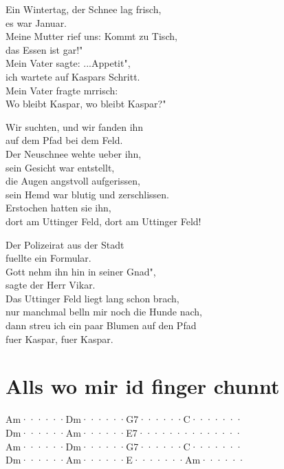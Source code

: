 \documentclass[
  letterpaper,
  twoside=false]{scrbook}
\begin{document}
Ein Wintertag, der Schnee lag frisch,\\
es war Januar.\\
Meine Mutter rief uns: Kommt zu Tisch,\\
das Essen ist gar!"\\
Mein Vater sagte: ...Appetit",\\
ich wartete auf Kaspars Schritt.\\
Mein Vater fragte mrrisch:\\
Wo bleibt Kaspar, wo bleibt Kaspar?"

Wir suchten, und wir fanden ihn\\
auf dem Pfad bei dem Feld.\\
Der Neuschnee wehte ueber ihn,\\
sein Gesicht war entstellt,\\
die Augen angstvoll aufgerissen,\\
sein Hemd war blutig und zerschlissen.\\
Erstochen hatten sie ihn,\\
dort am Uttinger Feld, dort am Uttinger Feld!

Der Polizeirat aus der Stadt\\
fuellte ein Formular.\\
Gott nehm\textquotesingle{} ihn hin in seiner Gnad"\textquotesingle,\\
sagte der Herr Vikar.\\
Das Uttinger Feld liegt lang schon brach,\\
nur manchmal bell\textquotesingle n mir noch die Hunde nach,\\
dann streu\textquotesingle{} ich ein paar Blumen auf den Pfad\\
fuer Kaspar, fuer Kaspar.

\hypertarget{alls-wo-mir-id-finger-chunnt}{%
\chapter{Alls wo mir id finger
chunnt}\label{alls-wo-mir-id-finger-chunnt}}

\textbar Am······\textbar Dm······\textbar G7······\textbar C·······\textbar{}\\
\textbar Dm······\textbar Am······\textbar E7······\textbar········\textbar{}\\
\textbar Am······\textbar Dm······\textbar G7······\textbar C·······\textbar{}\\
\textbar Dm······\textbar Am······\textbar E·······\textbar Am······\textbar{}
\end{document}

